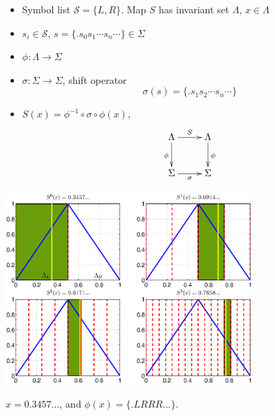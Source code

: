\documentclass[12pt,t]{beamer}
\begin{document}
\begin{frame}

\begin{itemize}\setlength{\parskip}{0pt}  \setlength{\itemsep}{5pt} \setlength{\topsep}{0pt}
     \item Symbol list $\mathcal{S} = \{L,R\}$. Map $S$ has invariant set $\Lambda$, $x\in \Lambda$
     \item  $s_i \in \mathcal{S}$, $s= \{.s_0s_1\cdots s_n\cdots\} \in \Sigma$
     \item  $\phi: \Lambda \rightarrow \Sigma$
     \item $\sigma: \Sigma \rightarrow \Sigma $, shift operator
           $$\sigma(s)= \{.s_1s_2\cdots s_n\cdots\}$$
     \item $S(x) = \phi^{-1}\circ \sigma \circ \phi(x)$,
           \begin{equation*}
          \xymatrix{
              \Lambda  \ar[d]_{\phi} \ar[r]^{S}
              & \Lambda   \ar[d]^{\phi} \\
          \Sigma \ar[r]_{\sigma}
              & \Sigma}
           \end{equation*}
\end{itemize}

\end{frame}
\begin{frame}

\centerline{
\includegraphics[width=0.7\textwidth]{tentmapplot2}
}
$x = 0.3457...  $, and $ \phi(x)=\{.LRRR...\}$.

\end{frame}
\end{document}
